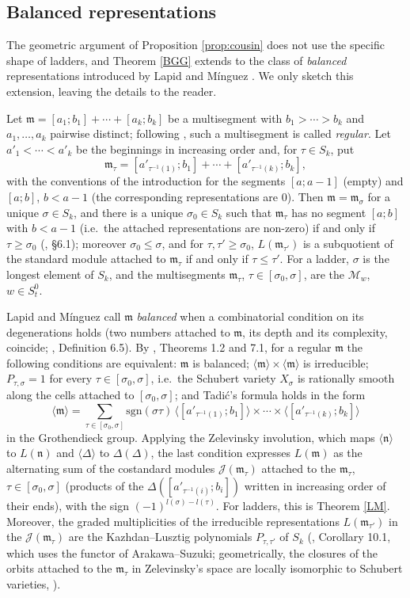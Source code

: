 \documentclass[a4paper,12pt,leqno]{amsart}
\newcommand{\frmm}{\mathfrak{m}}
\newcommand{\frn}{\mathfrak{n}}
\newcommand{\caJ}{\mathcal{J}}
\newcommand{\caM}{\mathcal{M}}
\theoremstyle{plain}
\theoremstyle{definition}
\theoremstyle{definition}
\begin{document}
\subsection{Balanced representations}\label{ssec:balanced}
The geometric argument of Proposition \ref{prop:cousin} does not use the specific shape of ladders,
and Theorem \ref{BGG} extends to the class of \emph{balanced} representations introduced by
Lapid and M\'inguez \cite{LM18}. We only sketch this extension, leaving the details to the reader.

Let $\frmm=[a_1;b_1]+\cdots+[a_k;b_k]$ be a multisegment with $b_1>\cdots>b_k$ and $a_1,\ldots,a_k$
pairwise distinct; following \cite{LM18}, such a multisegment is called \emph{regular}. Let
$a'_1<\cdots<a'_k$ be the beginnings in increasing order and, for $\tau\in S_k$, put
\[\frmm_\tau=[a'_{\tau^{-1}(1)};b_1]+\cdots+[a'_{\tau^{-1}(k)};b_k],\]
with the conventions of the introduction for the segments $[a;a-1]$ (empty) and $[a;b]$, $b<a-1$
(the corresponding representations are $0$). Then $\frmm=\frmm_\sigma$ for a unique $\sigma\in S_k$, and
there is a unique $\sigma_0\in S_k$ such that $\frmm_\tau$ has no segment $[a;b]$ with $b<a-1$
(i.e.\ the attached representations are non-zero) if and only if $\tau\geq\sigma_0$ (\cite{LM18},
\S6.1); moreover
$\sigma_0\leq\sigma$, and for $\tau,\tau'\geq\sigma_0$, $L(\frmm_{\tau'})$ is a subquotient of the
standard module attached to $\frmm_\tau$ if and only if $\tau\leq\tau'$. For a ladder, $\sigma$ is the
longest element of $S_k$, and the multisegments $\frmm_\tau$, $\tau\in[\sigma_0,\sigma]$, are the
$\caM_w$, $w\in S_t^0$.

Lapid and M\'inguez call $\frmm$ \emph{balanced} when a combinatorial condition on its degenerations
holds (two numbers attached to $\frmm$, its depth and its complexity, coincide; \cite{LM18},
Definition 6.5). By \cite{LM18}, Theorems 1.2 and 7.1, for a regular $\frmm$ the following conditions
are equivalent: $\frmm$ is balanced; $\langle\frmm\rangle\times\langle\frmm\rangle$ is irreducible;
$P_{\tau,\sigma}=1$ for every $\tau\in[\sigma_0,\sigma]$, i.e.\ the Schubert variety $X_\sigma$ is
rationally smooth along the cells attached to $[\sigma_0,\sigma]$; and Tadi\'c's formula holds in the
form
\[\langle\frmm\rangle=\sum_{\tau\in[\sigma_0,\sigma]}\mathrm{sgn}(\sigma\tau)\,
\langle[a'_{\tau^{-1}(1)};b_1]\rangle\times\cdots\times\langle[a'_{\tau^{-1}(k)};b_k]\rangle\]
in the Grothendieck group. Applying the Zelevinsky involution, which maps $\langle\frn\rangle$ to
$L(\frn)$ and $\langle\Delta\rangle$ to $\Delta(\Delta)$, the last condition expresses $L(\frmm)$ as the
alternating sum of the costandard modules $\caJ(\frmm_\tau)$ attached to the $\frmm_\tau$,
$\tau\in[\sigma_0,\sigma]$ (products of the $\Delta([a'_{\tau^{-1}(i)};b_i])$ written in increasing
order of their ends), with the sign $(-1)^{l(\sigma)-l(\tau)}$. For ladders, this is Theorem
\ref{LM}. Moreover, the graded multiplicities of the irreducible representations $L(\frmm_{\tau'})$ in
the $\caJ(\frmm_\tau)$ are the Kazhdan--Lusztig polynomials $P_{\tau,\tau'}$ of $S_k$ (\cite{LM18},
Corollary 10.1, which uses the functor of Arakawa--Suzuki; geometrically, the closures of the orbits
attached to the $\frmm_\tau$ in Zelevinsky's space are locally isomorphic to Schubert varieties,
\cite{Zel85}).
\end{document}
